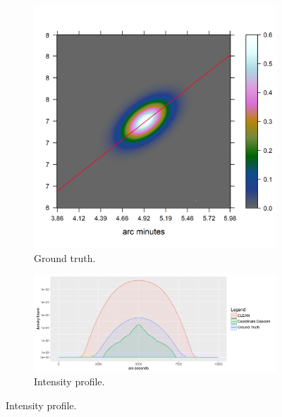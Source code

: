 \begin{figure}[h]
	\centering
	\begin{subfigure}[b]{0.3\linewidth}
		\includegraphics[width=\linewidth, trim={0.2in, 0.8in, 3.2in, 1.8in}, clip]{./chapters/20.results/mixed/mixed_cut_model_line.png}
		\caption{Ground truth.}
		\label{results:mixed:cut0:img}
	\end{subfigure}
	\begin{subfigure}[b]{0.6\linewidth}
		\includegraphics[width=\linewidth, trim={0, 0, 1in, 0.2in}, clip]{./chapters/20.results/mixed/mixed_cut0.png}
		\caption{Intensity profile.}
		\label{results:mixed:cut0:profile}
	\end{subfigure}
	\caption{Intensity profile.}
	\label{results:mixed:contour}
\end{figure}


